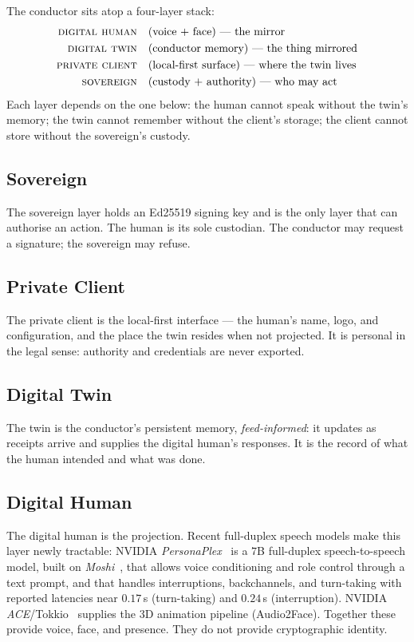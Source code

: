 \documentclass[11pt]{article}
\begin{document}
The conductor sits atop a four-layer stack:
\begin{align}
  \textsc{digital human}  &\quad \text{(voice $+$ face) --- the mirror} \notag\\
  \textsc{digital twin}   &\quad \text{(conductor memory) --- the thing mirrored} \notag\\
  \textsc{private client} &\quad \text{(local-first surface) --- where the twin lives} \notag\\
  \textsc{sovereign}      &\quad \text{(custody $+$ authority) --- who may act} \notag
\end{align}
Each layer depends on the one below: the human cannot speak without the twin's
memory; the twin cannot remember without the client's storage; the client cannot
store without the sovereign's custody.

\subsection{Sovereign}
The sovereign layer holds an Ed25519 signing key and is the only layer that can
authorise an action. The human is its sole custodian. The conductor may request a
signature; the sovereign may refuse.

\subsection{Private Client}
The private client is the local-first interface --- the human's name, logo, and
configuration, and the place the twin resides when not projected. It is personal in
the legal sense: authority and credentials are never exported.

\subsection{Digital Twin}
The twin is the conductor's persistent memory, \emph{feed-informed}: it updates as
receipts arrive and supplies the digital human's responses. It is the record of
what the human intended and what was done.

\subsection{Digital Human}
The digital human is the projection. Recent full-duplex speech models make this
layer newly tractable: NVIDIA \emph{PersonaPlex}~\cite{personaplex} is a
$7$B full-duplex speech-to-speech model, built on
\emph{Moshi}~\cite{moshi}, that allows voice conditioning and role control through
a text prompt, and that handles interruptions, backchannels, and turn-taking with
reported latencies near $0.17$\,s (turn-taking) and $0.24$\,s (interruption).
NVIDIA \emph{ACE}/Tokkio~\cite{ace,tokkio} supplies the 3D animation pipeline
(Audio2Face). Together these provide voice, face, and presence. They do not provide
cryptographic identity.
\end{document}
